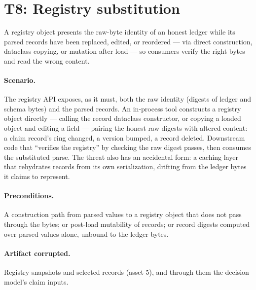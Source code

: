 \section{T8: Registry substitution}\label{threat:t8}

\begin{threat}\label{threat:thr:substitution}
A registry object presents the raw-byte identity of an honest ledger while its parsed records have been replaced, edited, or reordered --- via direct construction, dataclass copying, or mutation after load --- so consumers verify the right bytes and read the wrong content.
\end{threat}

\paragraph{Scenario.} The registry API exposes, as it must, both the raw identity (digests of ledger and schema bytes) and the parsed records. An in-process tool constructs a registry object directly --- calling the record dataclass constructor, or copying a loaded object and editing a field --- pairing the honest raw digests with altered content: a claim record's ring changed, a version bumped, a record deleted. Downstream code that ``verifies the registry'' by checking the raw digest passes, then consumes the substituted parse. The threat also has an accidental form: a caching layer that rehydrates records from its own serialization, drifting from the ledger bytes it claims to represent.

\paragraph{Preconditions.} A construction path from parsed values to a registry object that does not pass through the bytes; or post-load mutability of records; or record digests computed over parsed values alone, unbound to the ledger bytes.

\paragraph{Artifact corrupted.} Registry snapshots and selected records (asset 5), and through them the decision model's claim inputs.

